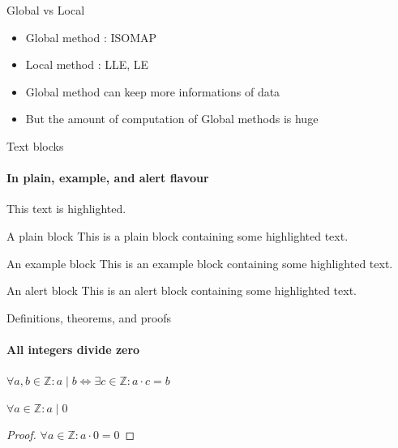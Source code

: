 \documentclass{beamer}
\begin{document}
\begin{darkframes}
	\begin{frame}{Global vs Local}
	\begin{itemize}
		\item Global method : ISOMAP
		\item Local method : LLE, LE
		\item Global method can keep more informations of data
		\item But the amount of computation of Global methods is huge
	\end{itemize}
	\end{frame}	    
    
    
    \begin{frame}[label=simmonshall]{Text blocks}
      \framesubtitle{In plain, example, and \alert{alert} flavour}
      \alert{This text} is highlighted.

      \begin{block}{A plain block}
        This is a plain block containing some \alert{highlighted text}.
      \end{block}
      \begin{exampleblock}{An example block}
        This is an example block containing some \alert{highlighted text}.
      \end{exampleblock}
      \begin{alertblock}{An alert block}
        This is an alert block containing some \alert{highlighted text}.
      \end{alertblock}
    \end{frame}

    \begin{frame}[label=proof]{Definitions, theorems, and proofs}
      \framesubtitle{All integers divide zero}
      \begin{definition}
        $\forall a,b\in\mathds{Z}: a\mid b\iff\exists c\in\mathds{Z}:a\cdot c=b$
      \end{definition}
      \begin{theorem}
        $\forall a\in\mathds{Z}: a\mid 0$
      \end{theorem}
      \begin{proof}[Proof\nopunct]
        $\forall a\in\mathds{Z}: a\cdot 0=0$
      \end{proof}
    \end{frame}


\end{darkframes}
\end{document}
